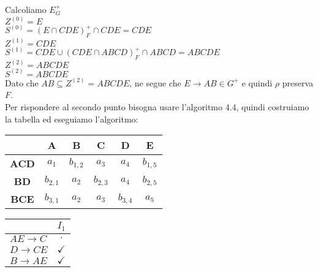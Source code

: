  \noindent Calcoliamo $E^+_G$\\
 $Z^{(0)}=E$\\
 $S^{(0)}=(E\cap CDE)^+_F \cap CDE= CDE$\\
 $Z^{(1)}=CDE$\\
 $S^{(1)}=CDE \cup (CDE \cap ABCD)^+_F \cap ABCD= ABCDE$\\
 $Z^{(2)}=ABCDE$\\
 $S^{(2)}=ABCDE$\\
 
 \noindent Dato che $AB \subseteq Z^{(2)} = ABCDE$, ne segue che $E\rightarrow AB \in G^+$ e quindi $\rho$ preserva $F$.\\
 
\noindent Per rispondere al secondo punto bisogna usare l'algoritmo 4.4, quindi costruiamo la tabella ed eseguiamo l'algoritmo:

\begin{multicols}{2}
   \begin{center}
  \begin{tabular}{c|c|c|c|c|c}
    & \textbf{A} & \textbf{B} &\textbf{C} &\textbf{D}     &\textbf{E}\\
   \hline
   \textbf{ACD} & $a_1$       & $b_{1,2}$ & $a_3$ & $a_4$ & $b_{1,5}$ \\
   \hline
   \textbf{BD}  &$b_{2,1}$    & $a_2$     & $b_{2,3}$ & $a_4$ & $b_{2,5}$ \\
   \hline
   \textbf{BCE} & $b_{3,1}$   & $a_2$  & $a_3$ & $b_{3,4}$ & $a_5$\\
  \end{tabular}
 \end{center}
 
  \begin{center}
  \begin{tabular}{l|c}
   & $I_1$\\
   \hline
   $AE\rightarrow C$ & $\cdot$\\
   $D\rightarrow CE$ & $\checkmark$\\
   $B \rightarrow AE$ & $\checkmark$\\
  \end{tabular}
 \end{center}
 \end{multicols}
 
